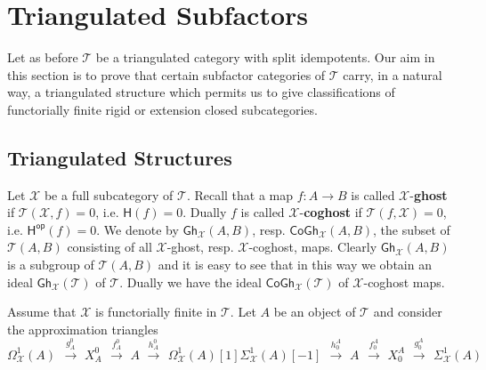 \documentclass[oneside, a4paper,reqno]{amsart}
\numberwithin{equation}{section}
\theoremstyle{definition}
\begin{document}
\section{Triangulated Subfactors} 

Let as before ${\mathcal T}$ be a triangulated category with split idempotents. Our aim in this section is to  prove that certain subfactor categories of ${\mathcal T}$ carry, in a natural way, a triangulated structure which permits us to give classifications of functorially finite rigid or extension closed subcategories.  

\subsection{Triangulated Structures} Let ${\mathcal X}$ be a full subcategory of ${\mathcal T}$. Recall that a map $f \colon A {\longrightarrow} B$ is called ${\mathcal X}$-{\bf ghost} if ${\mathcal T}({\mathcal X},f) = 0$, i.e. $\mathsf{H}(f) = 0$. Dually $f$ is called ${\mathcal X}$-{\bf coghost} if ${\mathcal T}(f,{\mathcal X}) = 0$, i.e. $\mathsf{H}^\operatorname*{\mathsf{op}}(f) = 0$. We denote by $\mathsf{Gh}_{\mathcal X}(A,B)$, resp. $\mathsf{CoGh}_{\mathcal X}(A,B)$, the subset of ${\mathcal T}(A,B)$ consisting of all ${\mathcal X}$-ghost, resp. ${\mathcal X}$-coghost, maps. Clearly $\mathsf{Gh}_{\mathcal X}(A,B)$ is a subgroup
of ${\mathcal T}(A,B)$ and it is easy to see that in this way we obtain an
ideal $\mathsf{Gh}_{\mathcal X}({\mathcal T})$ of ${\mathcal T}$. Dually we have the ideal $\mathsf{CoGh}_{\mathcal X}({\mathcal T})$ of ${\mathcal X}$-coghost maps.  

Assume that ${\mathcal X}$ is functorially finite in ${\mathcal T}$.   Let $A$ be an object of ${\mathcal T}$ and consider the approximation triangles
\begin{subequations}
\begin{equation}
  \Omega^{1}_{\mathcal X}(A) \,\ \stackrel{g^{0}_{A}}{\longrightarrow} \,\, X^{0}_{A} \,\ \stackrel{f^{0}_{A}}{\longrightarrow} \,\, A \,\, \stackrel{h^{0}_{A}}{\longrightarrow} \,\ \Omega^{1}_{\mathcal X}(A)[1]
\end{equation}    
\begin{equation}
 \Sigma^{1}_{\mathcal X}(A)[-1] \,\ \stackrel{h^{A}_{0}}{\longrightarrow} \,\, A \,\ \stackrel{f^{A}_{0}}{\longrightarrow} \,\, X^{A}_{0} \,\, \stackrel{g^{A}_{0}}{\longrightarrow} \,\ \Sigma^{1}_{\mathcal X}(A)
 \end{equation}
\end{subequations}
\end{document}
